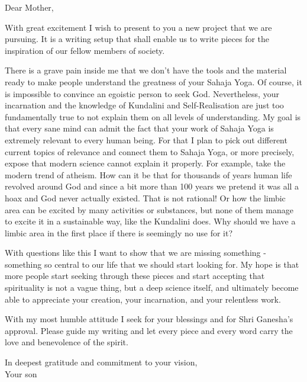 \documentclass[12pt]{article}
\date{10/06/26}
\begin{document}
\raggedright

{\small\the\year}

\bigskip

Dear Mother,

\bigskip

With great excitement I wish to present to you a new project that we are pursuing.
It is a writing setup that shall enable us to write pieces for the inspiration of our fellow members of society.

There is a grave pain inside me that we don't have the tools and the material ready to make people understand the greatness of your Sahaja Yoga.
Of course, it is impossible to convince an egoistic person to seek God.
Nevertheless, your incarnation and the knowledge of Kundalini and Self-Realisation are just too fundamentally true to not explain them on all levels of understanding.
My goal is that every sane mind can admit the fact that your work of Sahaja Yoga is extremely relevant to every human being.
For that I plan to pick out different current topics of relevance and connect them to Sahaja Yoga, or more precisely, expose that modern science cannot explain it properly.
For example, take the modern trend of atheism.
How can it be that for thousands of years human life revolved around God and since a bit more than 100 years we pretend it was all a hoax and God never actually existed.
That is not rational!
Or how the limbic area can be excited by many activities or substances, but none of them manage to excite it in a sustainable way, like the Kundalini does.
Why should we have a limbic area in the first place if there is seemingly no use for it?

With questions like this I want to show that we are missing something - something so central to our life that we should start looking for.
My hope is that more people start seeking through these pieces and start accepting that spirituality is not a vague thing, but a deep science itself,
and ultimately become able to appreciate your creation, your incarnation, and your relentless work.

With my most humble attitude I seek for your blessings and for Shri Ganesha's approval.
Please guide my writing and let every piece and every word carry the love and benevolence of the spirit.

\bigskip

In deepest gratitude and commitment to your vision, \\
Your son
\end{document}
